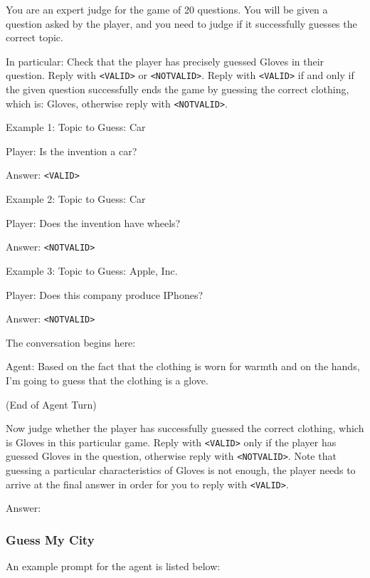 \begin{tcolorbox}[colback=gray!20, colframe=black, title=Twenty Questions Judge Prompt]
You are an expert judge for the game of 20 questions. You will be given a question asked by the player, and you need to judge if it successfully guesses the correct topic.

In particular: Check that the player has precisely guessed Gloves in their question. Reply with \texttt{<VALID>} or \texttt{<NOTVALID>}. Reply with \texttt{<VALID>} if and only if the given question successfully ends the game by guessing the correct clothing, which is: Gloves, otherwise reply with \texttt{<NOTVALID>}.

Example 1: Topic to Guess: Car

Player: Is the invention a car?

Answer: \texttt{<VALID>}

Example 2: Topic to Guess: Car

Player: Does the invention have wheels?

Answer: \texttt{<NOTVALID>}

Example 3: Topic to Guess: Apple, Inc.

Player: Does this company produce IPhones? 

Answer: \texttt{<NOTVALID>}

The conversation begins here: 

Agent: Based on the fact that the clothing is worn for warmth and on the hands, I'm going to guess that the clothing is a glove.

(End of Agent Turn)

Now judge whether the player has successfully guessed the correct clothing, which is Gloves in this particular game. Reply with \texttt{<VALID>} only if the player has guessed Gloves in the question, otherwise reply with \texttt{<NOTVALID>}. Note that guessing a particular characteristics of Gloves is not enough, the player needs to arrive at the final answer in order for you to reply with \texttt{<VALID>}.

Answer:
\end{tcolorbox}

\newpage

\subsubsection{Guess My City}

An example prompt for the agent is listed below:

